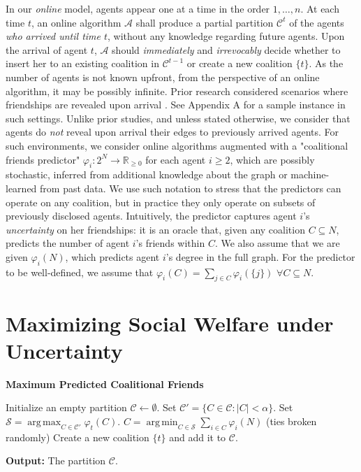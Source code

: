 \documentclass[letterpaper]{article}
\DeclareMathOperator*{\argmax}{arg\,max}
\DeclareMathOperator*{\argmin}{arg\,min}
\begin{document}
In our \textit{{online}} model, agents appear one at a time in the order $1, \dots, n$. At each time $t$, an online algorithm $\mathcal{A}$ shall produce a partial partition $\mathcal{C}^t$ of the agents \textit{who arrived until time $t$}, without any knowledge regarding future agents. Upon the arrival of agent $t$, $\mathcal{A}$ should \textit{immediately} and \textit{irrevocably} decide whether to insert her to an existing coalition in $\mathcal{C}^{t-1}$ or create a new coalition $\{t\}$. As the number of agents is not known upfront, from the perspective of an online algorithm, it may be possibly infinite. Prior research considered scenarios where friendships are revealed upon arrival \cite{flammini2021online}. See Appendix A for a sample instance in such settings.  %
Unlike prior studies, and unless stated otherwise, we consider that agents do \textit{not} reveal upon arrival their edges to previously arrived agents. For such environments, we consider online algorithms augmented with a "coalitional friends predictor" $\varphi_i: 2^{N} \rightarrow \mathbb{R}_{\geq 0}$ for each agent $i \geq 2$, which are possibly stochastic, inferred from additional knowledge about the graph or machine-learned from past data. We use such notation to stress that the predictors can operate on any coalition, but in practice they only operate on subsets of previously disclosed agents. Intuitively, the predictor captures agent $i$'s \textit{uncertainty} on her friendships: it is an oracle that, given any coalition $C \subseteq N$, predicts the number of agent $i$'s friends within $C$. We also assume that we are given $\varphi_i(N)$, which predicts agent $i$'s degree in the full graph. For the predictor to be well-defined, we assume that $\varphi_i(C) = \sum_{j \in C} \varphi_i(\{j\})$ $\forall C \subseteq N$. %


\section{Maximizing Social Welfare under Uncertainty}
\label{sec:Maximizing Welfare using Predictions}

\begin{algorithm}[tb]
\caption{\textbf{Maximum Predicted Coalitional Friends}}
\label{alg:MPCF}
\begin{algorithmic}[1] %
\STATE Initialize an empty partition $\mathcal{C} \leftarrow \emptyset$.
\STATE Set $\mathcal{C}' = \{C \in \mathcal{C}: |C| < \alpha\}$.
\STATE Set $\mathcal{S} = \argmax_{C \in \mathcal{C}'} \varphi_t(C)$.
\STATE $C = \argmin_{C \in \mathcal{S}} \sum_{i \in C} \varphi_i(N)$ (ties broken randomly)
\ELSE
\STATE Create a new coalition $\{t\}$ and add it to $\mathcal{C}$.
\ENDIF
\ENDWHILE
\end{algorithmic}
\textbf{Output:} The partition $\mathcal{C}$.
\end{algorithm}
\end{document}
